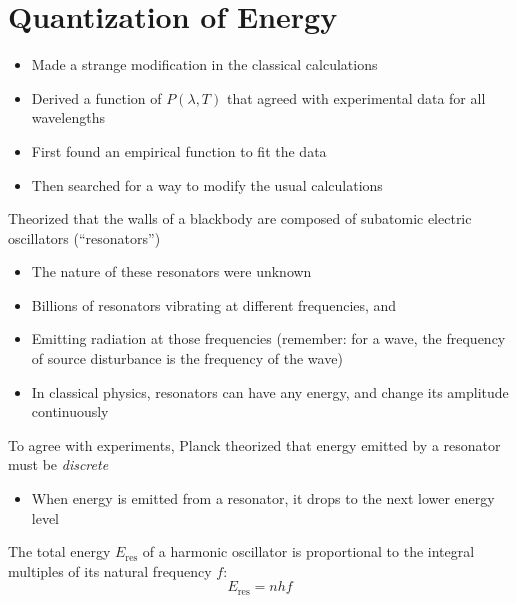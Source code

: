 \section{Quantization of Energy}
%  
%    
\begin{itemize}
\item Made a strange modification in the classical calculations
\item Derived a function of $P(\lambda,T)$ that agreed with experimental
  data for all wavelengths
\item First found an empirical function to fit the data
\item Then searched for a way to modify the usual calculations
\end{itemize}

Theorized that the walls of a blackbody are composed of subatomic electric
oscillators (``resonators'')
\begin{itemize}
\item The nature of these resonators were unknown
\item Billions of resonators vibrating at different frequencies, and
\item Emitting radiation at those frequencies (remember: for a wave, the
  frequency of source disturbance is the frequency of the wave)
\item In classical physics, resonators can have any energy, and change
  its amplitude continuously
\end{itemize}
To agree with experiments, Planck theorized that energy emitted by a
resonator must be \emph{discrete}
\begin{itemize}
\item When energy is emitted from a resonator, it drops to the next
  lower energy level
\end{itemize}

The total energy $E_\text{res}$ of a harmonic oscillator is proportional
to the integral multiples of its natural frequency $f$:
\begin{equation}
  \boxed{E_\text{res}=nhf}
\end{equation}

